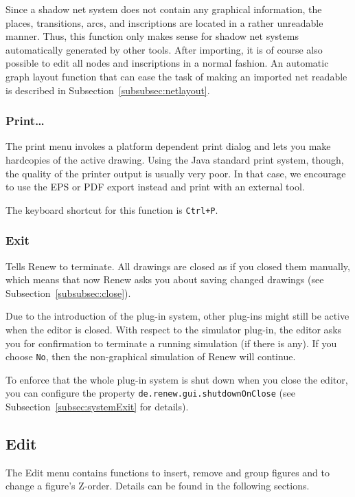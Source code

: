 Since a shadow net system does not contain any graphical
information,
the places, transitions, arcs, and inscriptions are
located in a rather unreadable manner.
Thus, this function only makes sense for shadow net systems
automatically generated by other tools.
After importing, it is of course also possible to edit all
nodes and inscriptions in a normal fashion.
An automatic graph layout function that can
ease the task of making an imported net readable
is described in Subsection~\ref{subsubsec:netlayout}.


\subsubsection{Print\dots}

The print menu invokes a platform dependent print dialog and lets you
make hardcopies of the active drawing. Using the Java standard print
system, though, the quality of the printer output is usually very
poor. In that case, we encourage to use the EPS or PDF export instead and print with an external tool.

The keyboard shortcut for this function is \texttt{Ctrl+P}.


\subsubsection{Exit}

Tells Renew to terminate. 
All drawings are closed as if you closed them manually,
which means that now Renew asks you about saving
changed drawings (see Subsection~\ref{subsubsec:close}).

Due to the introduction of the plug-in system, other plug-ins might
still be active when the editor is closed.
With respect to the simulator plug-in, the editor asks you for
confirmation to terminate a running simulation (if there is any).
If you choose \texttt{No}, then the non-graphical simulation of
Renew will continue.

To enforce that the whole plug-in system is shut down when you
close the editor, you can configure the property
\texttt{de.renew.gui.shutdownOnClose} (see
Subsection~\ref{subsec:systemExit} for details).

\subsection{Edit}
\label{subsec:menuEdit}

The Edit menu contains functions to insert, remove and group
figures and to change a figure's Z-order.
Details can be found in the following sections.


